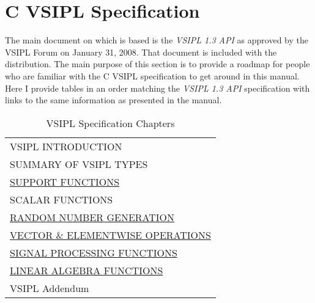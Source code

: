 \section*{C VSIPL Specification}
The main document on which  is based is the \emph{VSIPL 1.3 API} as approved by the VSIPL Forum on January 31, 2008.  That document is included with the  distribution.  The main purpose of this section is to provide a roadmap for people who are familiar with the C VSIPL specification to get around in this  manual.  Here I provide tables in an order matching the \emph{VSIPL 1.3 API} specification with links to the same information as presented  in the  manual.
\begin{table}[H]
\hypertarget{VSIPspecHead}{}
\caption{VSIPL Specification Chapters}
\label{tab:vsiplAPI}
\begin{center}
\begin{tabular}{l}
VSIPL INTRODUCTION\\
SUMMARY OF VSIPL TYPES\\
\hyperlink{vsiplAPISupport}{SUPPORT FUNCTIONS}\\
SCALAR FUNCTIONS\\
\hyperlink{Random}{RANDOM NUMBER GENERATION}\\
\hyperlink{vectorAndElementwise}{VECTOR \& ELEMENTWISE OPERATIONS}\\
\hyperlink{vsipljSignalProcessing}{SIGNAL PROCESSING FUNCTIONS}\\
\hyperlink{linearAlgebraFunctions}{LINEAR ALGEBRA FUNCTIONS}\\
VSIPL Addendum\\
\end{tabular}
\end{center}
\label{default}
\end{table}%